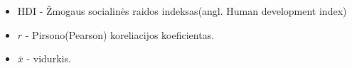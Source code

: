 \begin{itemize}
    \item HDI - Žmogaus socialinės raidos indeksas(angl. Human development index)
    \item $r$ - Pirsono(Pearson) koreliacijos koeficientas.
    \item $\bar{x}$ - vidurkis.
\end{itemize}